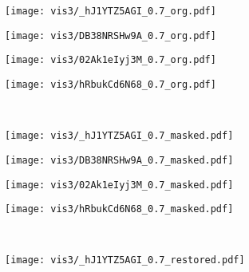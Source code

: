 \documentclass{article}
\begin{document}
\begin{figure}[h]
\centering
    \begin{subfigure}[b]{0.245\linewidth}
        \texttt{[image: vis3/\_hJ1YTZ5AGI\_0.7\_org.pdf]}
    \end{subfigure}
    \begin{subfigure}[b]{0.245\linewidth}
        \texttt{[image: vis3/DB38NRSHw9A\_0.7\_org.pdf]}
    \end{subfigure}     
    \begin{subfigure}[b]{0.245\linewidth}
        \texttt{[image: vis3/02Ak1eIyj3M\_0.7\_org.pdf]}
    \end{subfigure}
    \begin{subfigure}[b]{0.245\linewidth}
        \texttt{[image: vis3/hRbukCd6N68\_0.7\_org.pdf]}
    \end{subfigure}
    \\
    \begin{subfigure}[b]{0.245\linewidth}
        \texttt{[image: vis3/\_hJ1YTZ5AGI\_0.7\_masked.pdf]}
    \end{subfigure}
    \begin{subfigure}[b]{0.245\linewidth}
        \texttt{[image: vis3/DB38NRSHw9A\_0.7\_masked.pdf]}
    \end{subfigure}     
    \begin{subfigure}[b]{0.245\linewidth}
        \texttt{[image: vis3/02Ak1eIyj3M\_0.7\_masked.pdf]}
    \end{subfigure}
    \begin{subfigure}[b]{0.245\linewidth}
        \texttt{[image: vis3/hRbukCd6N68\_0.7\_masked.pdf]}
    \end{subfigure}
    \\ 
    \begin{subfigure}[b]{0.245\linewidth}
        \texttt{[image: vis3/\_hJ1YTZ5AGI\_0.7\_restored.pdf]}
        \vspace{-0.2em}
\end{subfigure}
\end{figure}
\end{document}
